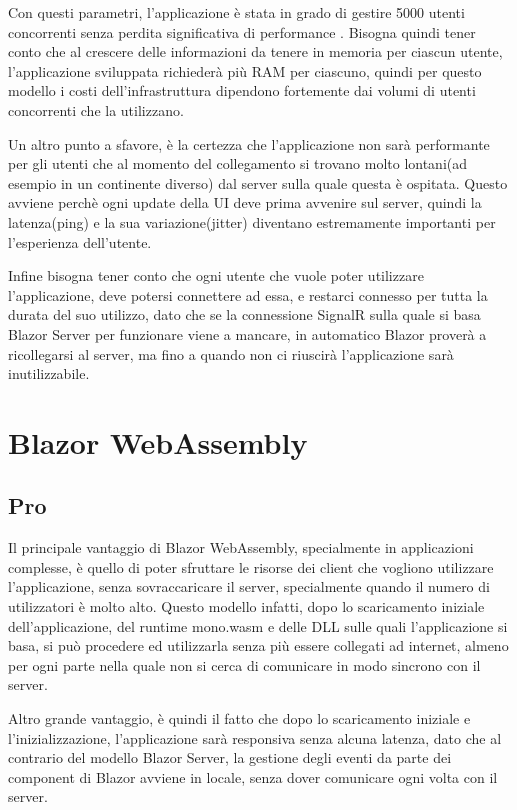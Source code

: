 Con questi parametri, l'applicazione \`e stata in grado di gestire 5000 utenti concorrenti senza perdita significativa di performance \cite{blazorModelsScenarios} \cite{bServerConcurrentUsersTest}.
Bisogna quindi tener conto che al crescere delle informazioni da tenere in memoria per ciascun utente, l'applicazione sviluppata richieder\`a pi\`u RAM per ciascuno, quindi per questo modello i costi dell'infrastruttura dipendono fortemente dai volumi di utenti concorrenti che la utilizzano.

Un altro punto a sfavore, \`e la certezza che l'applicazione non sar\`a performante per gli utenti che al momento del collegamento si trovano molto lontani(ad esempio in un continente diverso) dal server sulla quale questa \`e ospitata.
Questo avviene perch\`e ogni update della UI deve prima avvenire sul server, quindi la latenza(ping) e la sua variazione(jitter) diventano estremamente importanti per l'esperienza dell'utente.

Infine bisogna tener conto che ogni utente che vuole poter utilizzare l'applicazione, deve potersi connettere ad essa, e restarci connesso per tutta la durata del suo utilizzo, dato che se la connessione SignalR sulla quale si basa Blazor Server per funzionare viene a mancare, in automatico Blazor prover\`a a ricollegarsi al server, ma fino a quando non ci riuscir\`a l'applicazione sar\`a inutilizzabile.

\pagebreak

\section{Blazor WebAssembly}\label{sez:scalabilitaBWA}
\subsection{Pro}\label{sez:proBWA}
Il principale vantaggio di Blazor WebAssembly, specialmente in applicazioni complesse, \`e quello di poter sfruttare le risorse dei client che vogliono utilizzare l'applicazione, senza sovraccaricare il server, specialmente quando il numero di utilizzatori \`e molto alto.
Questo modello infatti, dopo lo scaricamento iniziale dell'applicazione, del runtime mono.wasm e delle DLL sulle quali l'applicazione si basa, si pu\`o procedere ed utilizzarla senza pi\`u essere collegati ad internet, almeno per ogni parte nella quale non si cerca di comunicare in modo sincrono con il server.

Altro grande vantaggio, \`e quindi il fatto che dopo lo scaricamento iniziale e l'inizializzazione, l'applicazione sar\`a responsiva senza alcuna latenza, dato che al contrario del modello Blazor Server, la gestione degli eventi da parte dei component di Blazor avviene in locale, senza dover comunicare ogni volta con il server.

